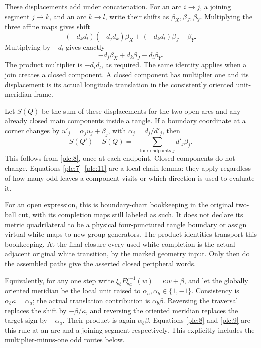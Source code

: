 These displacements add under concatenation. For an arc \(i\to j\), a
joining segment \(j\to k\), and an arc \(k\to l\), write their shifts as
\(\beta_X,\beta_J,\beta_Y\). Multiplying the three affine maps gives
shift \begin{equation}
(-d_kd_l)(-d_jd_k)\beta_X
       +(-d_kd_l)\beta_J+\beta_Y.
\end{equation} Multiplying by \(-d_l\) gives exactly \begin{equation}
-d_j\beta_X+d_k\beta_J-d_l\beta_Y.
\label{plc:10}
\end{equation} The product multiplier is \(-d_id_l\), as required. The same identity
applies when a join creates a closed component. A closed component has
multiplier one and its displacement is its actual longitude translation
in the consistently oriented unit-meridian frame.

Let \(S(Q)\) be the sum of these displacements for the two open arcs and
any already closed main components inside a tangle. If a boundary
coordinate at a corner changes by \(u'_j=\alpha_j u_j+\beta_j\), with
\(\alpha_j=d_j/d'_j\), then \begin{equation}
S(Q')-S(Q)=-\sum_{\text{four endpoints }j}d'_j\beta_j.
\label{plc:11}
\end{equation} This follows from \eqref{plc:8}, once at each endpoint. Closed components do
not change. Equations \eqref{plc:7}--\eqref{plc:11} are a local chain lemma: they apply
regardless of how many odd leaves a component visits or which direction
is used to evaluate it.

For an open expression, this is boundary-chart bookkeeping in the
original two-ball cut, with its completion maps still labeled as such.
It does not declare its metric quadrilateral to be a physical
four-punctured tangle boundary or assign virtual white maps to new group
generators. The product identities transport this bookkeeping. At the
final closure every used white completion is the actual adjacent
original white transition, by the marked geometry input. Only then do the
assembled paths give the asserted closed peripheral words.

Equivalently, for any one step write
\(\xi_bF\xi_a^{-1}(w)=\kappa w+\beta\), and let the globally oriented
meridian be the local unit raised to \(\alpha_a,\alpha_b\in\{1,-1\}\).
Consistency is \(\alpha_b\kappa=\alpha_a\); the actual translation
contribution is \(\alpha_b\beta\). Reversing the traversal replaces the
shift by \(-\beta/\kappa\), and reversing the oriented meridian replaces
the target sign by \(-\alpha_a\). Their product is again
\(\alpha_b\beta\). Equations \eqref{plc:8} and \eqref{plc:9} are this rule at an arc and a
joining segment respectively. This explicitly includes the
multiplier-minus-one odd routes below.

